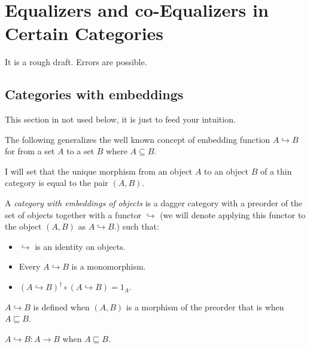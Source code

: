 \chapter{Equalizers and co-Equalizers in Certain Categories}

It is a rough draft. Errors are possible.


\section{Categories with embeddings}

\begin{note}
  This section in not used below, it is just to feed your intuition.
\end{note}

The following generalizes the well known concept of embedding function $A
\hookrightarrow B$ for from a set $A$ to a set $B$ where $A \subseteq B$.

I will set that the unique morphism from an object $A$ to an object $B$ of a
thin category is equal to the pair $(A , B)$.

\begin{defn}
  A \emph{category with embeddings of objects} is a dagger category with a
  preorder of the set of objects together with a functor $\hookrightarrow$ (we
  will denote applying this functor to the object $(A , B)$ as $A
  \hookrightarrow B$.) such that:
  \begin{itemize}
    \item $\hookrightarrow$ is an identity on objects.
    
    \item Every $A \hookrightarrow B$ is a monomorphism.
    
    \item $(A \hookrightarrow B)^{\dagger} \circ (A \hookrightarrow B) = 1_A$.
  \end{itemize}
\end{defn}

\begin{obvious}
$A\hookrightarrow B$ is defined when $(A , B)$ is a morphism of the preorder
that is when $A \sqsubseteq B$.
\end{obvious}

\begin{obvious}
$A \hookrightarrow B : A \rightarrow B$ when $A \sqsubseteq B$.
\end{obvious}

